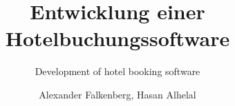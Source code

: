 \documentclass[envcountsame, envcountchap, deutsch]{i-studis}
\begin{document}
\title{Entwicklung einer Hotelbuchungssoftware}
\subtitle{Development of hotel booking software}

\author{Alexander Falkenberg, Hasan Alhelal}


\address{Ort}


\mytitlepage

\frontmatter
\tableofcontents										%
\listoffigures											%


\mainmatter










\backmatter
\printindex												%


\begin{appendix}
\end{appendix}
\end{document}
